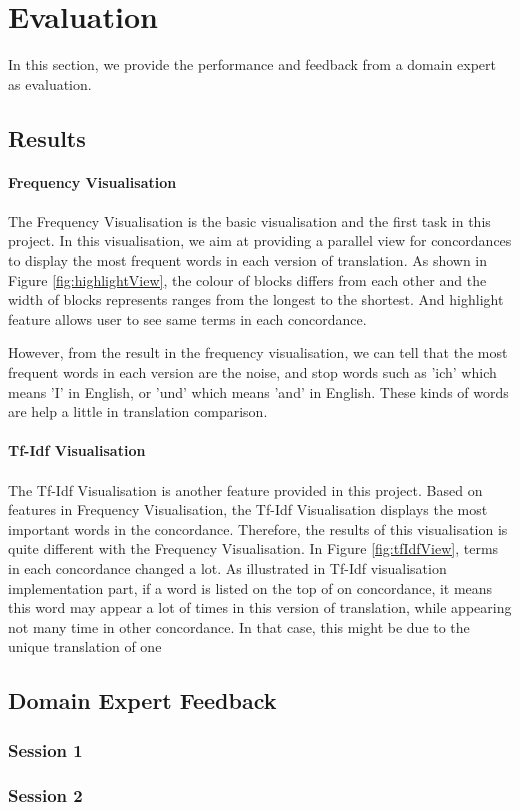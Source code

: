 \clearpage
\section{Evaluation}
In this section, we provide the performance and feedback from a domain expert as evaluation.

\subsection{Results}
\paragraph{Frequency Visualisation}
\paragraph[]{}
The Frequency Visualisation is the basic visualisation and the first task in this project. In this visualisation, we aim at providing a parallel view for concordances to display the most frequent words in each version of translation. As shown in Figure \ref{fig:highlightView}, the colour of blocks differs from each other and the width of blocks represents ranges from the longest to the shortest. And highlight feature allows user to see same terms in each concordance. 

However, from the result in the frequency visualisation, we can tell that the most frequent words in each version are the noise, and stop words such as 'ich' which means 'I' in English, or 'und' which means 'and' in English. These kinds of words are help a little in translation comparison.

\paragraph{Tf-Idf Visualisation}
\paragraph[]{}The Tf-Idf Visualisation is another feature provided in this project. Based on features in Frequency Visualisation, the Tf-Idf Visualisation displays the most important words in the concordance. Therefore, the results of this visualisation is quite different with the Frequency Visualisation. In Figure \ref{fig:tfIdfView}, terms in each concordance changed a lot. As illustrated in Tf-Idf visualisation implementation part, if a word is listed on the top of on concordance, it means this word may appear a lot of times in this version of translation, while appearing not many time in other concordance. In that case, this might be due to the unique translation of one 

\subsection{Domain Expert Feedback}

\subsubsection{Session 1}

\subsubsection{Session 2}